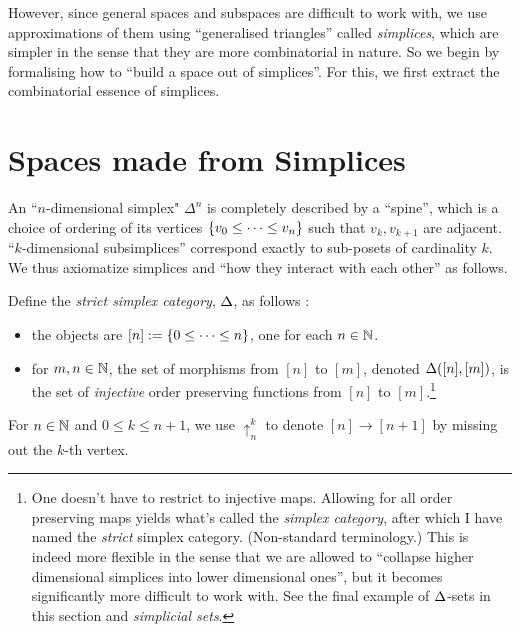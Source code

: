 \documentclass{article}
\begin{document}
\begin{rmk}
  However, since general spaces and subspaces are difficult to work with,
  we use approximations of them using ``generalised triangles'' called
  \emph{simplices},
  which are simpler in the sense that they are more combinatorial in nature.
  So we begin by formalising how to ``build a space out of simplices''.
  For this, we first extract the combinatorial essence of simplices.

\end{rmk}

\section{Spaces made from Simplices}

\begin{rmk}
  
  An ``$n$-dimensional simplex" $\Delta^n$ is 
  completely described by a ``spine'',
  which is a choice of ordering of its vertices $\left\{v_0 \leq \dots \leq v_n\right\}$
  such that $v_k, v_{k+1}$ are adjacent. 
  ``$k$-dimensional subsimplices'' correspond exactly to 
  sub-posets of cardinality $k$.
  We thus axiomatize simplices and ``how they interact with each other''
  as follows.
\end{rmk}

\begin{dfn}

  Define the \emph{strict simplex category}, $\Delta$, as follows : 
  \begin{itemize}
    \item the objects are $[n] := \left\{0 \leq \cdots \leq n\right\}$,
    one for each $n \in \mathbb{N}$.
    \item for $m,n \in \mathbb{N}$, the set of morphisms from $[n]$ to $[m]$,
    denoted $\Delta([n],[m])$,
    is the set of \emph{injective} order preserving functions 
    from $[n]$ to $[m]$.\footnote{
      One doesn't have to restrict to injective maps. 
      Allowing for all order preserving maps yields 
      what's called the \emph{simplex category},
      after which I have named the \emph{strict} simplex category.
      (Non-standard terminology.)
      This is indeed more flexible in the sense that 
      we are allowed to ``collapse higher dimensional simplices into 
      lower dimensional ones'',
      but it becomes significantly more difficult to work with.
      See the final example of $\Delta$-sets in this section and 
      \emph{simplicial sets}.
    }
  \end{itemize}
  For $n \in \mathbb{N}$ and $0 \leq k \leq n+1$,
  we use $\uparrow^k_n$ to denote $[n] \to [n+1]$ by 
  missing out the $k$-th vertex.  
\end{dfn}
\end{document}

